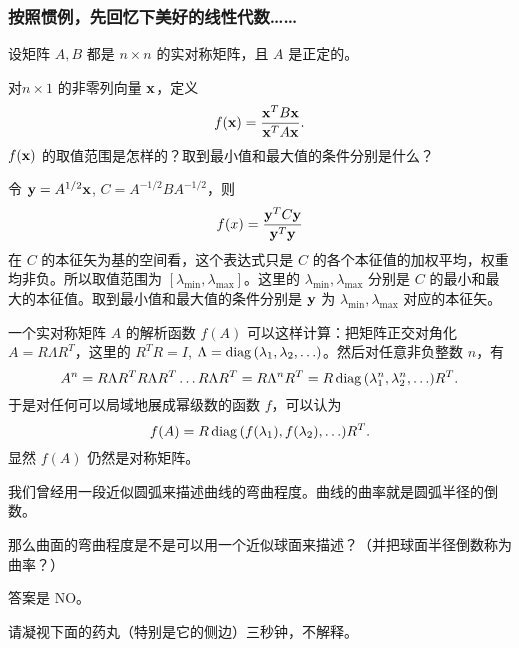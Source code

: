 \documentclass[CJK,13pt]{beamer}
\date{}
\begin{document}
  \bch
{}



\begin{frame}
  \frametitle{按照惯例，先回忆下美好的线性代数……}

  
  设矩阵 $A,B$ 都是 $n\times n$ 的实对称矩阵，且  $A$ 是正定的。
  
对$n\times 1$ 的非零列向量 ${\mathbf{x}}$，定义
$$ f({\mathbf{x}}) = \frac{{\mathbf{x}}^TB{\mathbf{x}}}{{\mathbf{x}}^TA{\mathbf{x}}}.$$
 $f({\mathbf{x}})$ 的取值范围是怎样的？取到最小值和最大值的条件分别是什么？
\end{frame}


\begin{frame}
  令 ${\mathbf{y}} = A^{1/2}{\mathbf{x}} $, $C = A^{-1/2} B A^{-1/2}$，则  
  $$ f(x) = \frac{{\mathbf{y}}^TC{\mathbf{y}}}{{\mathbf{y}}^T{\mathbf{y}}} $$
  在 $C$ 的本征矢为基的空间看，这个表达式只是 $C$ 的各个本征值的加权平均，权重均非负。所以取值范围为
  $\left[\lambda_{\min}, \lambda_{\max}\right]$。这里的 $\lambda_{\min},\lambda_{\max}$ 分别是 $C$ 的最小和最大的本征值。取到最小值和最大值的条件分别是 ${\mathbf{y}}$ 为 $\lambda_{\min},\lambda_{\max}$ 对应的本征矢。


  \skiplines
  
  {\scriptsize 一个实对称矩阵 $A$ 的解析函数 $f(A)$ 可以这样计算：把矩阵正交对角化 $A = R\Lambda R^T$，这里的 $R^TR=I$, $\Lambda=\mathrm{diag}\,(\lambda_1,\lambda_2,\ldots)$。然后对任意非负整数 $n$，有
    $$A^n = R\Lambda R^T R\Lambda R^T\ldots R\Lambda R^T = R\Lambda^n R^T = R\,\mathrm{diag}\,(\lambda_1^n, \lambda_2^n, \ldots) R^T.$$
    于是对任何可以局域地展成幂级数的函数 $f$，可以认为
    $$ f(A) = R\, \mathrm{diag}\,(f(\lambda_1), f(\lambda_2), \ldots) R^T.$$
    显然 $f(A)$ 仍然是对称矩阵。
  }
\end{frame}



\begin{frame}
  我们曾经用一段近似圆弧来描述曲线的弯曲程度。曲线的曲率就是圆弧半径的倒数。


  \skiplines
  
  那么曲面的弯曲程度是不是可以用一个近似球面来描述？（并把球面半径倒数称为曲率？）
  
\end{frame}


\begin{frame}
  答案是 NO。

  请凝视下面的药丸（特别是它的侧边）三秒钟，不解释。
  
\end{frame}
\end{document}
